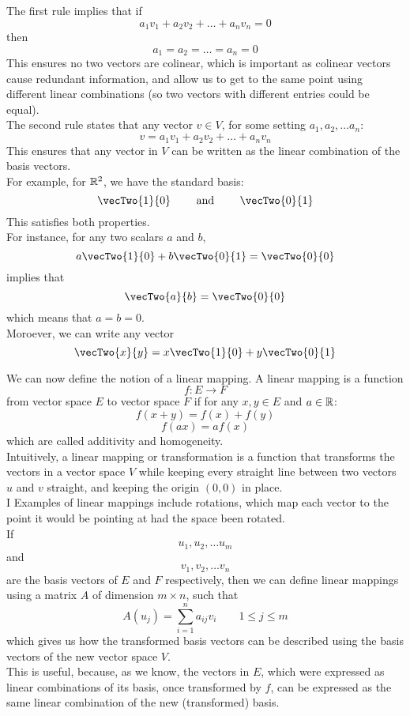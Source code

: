 \documentclass[12pt]{article}
\begin{document}
    The first rule implies that if
    \[ a_1v_1 + a_2v_2 + \dots + a_nv_n = 0 \]
    then 
    \[a_1 = a_2 = \dots = a_n = 0\]
    This ensures no two vectors are colinear,
    which is important as colinear vectors
    cause redundant information,
    and allow us to get to the same point
    using different linear combinations
    (so two vectors with different entries could
    be equal). \\

    The second rule states that any vector $v \in V$,
    for some setting $a_1, a_2, \dots a_n$:
    \[ v = a_1v_1 + a_2v_2 + \dots + a_nv_n \]
    This ensures that any vector in $V$
    can be written as the linear combination
    of the basis vectors. \\

    For example, for $\mathbb{R}^2$,
    we have the standard basis:
    \[ \vecTwo{1}{0} \qquad
    \text{ and } \qquad \vecTwo{0}{1} \]
    This satisfies both properties. \\
    For instance, for any two scalars $a$ and $b$,
    \[ a\vecTwo{1}{0} + b\vecTwo{0}{1} = \vecTwo{0}{0} \]
    implies that 
    \[ \vecTwo{a}{b} = \vecTwo{0}{0}  \]
    which means that $a = b = 0$. \\
    Moroever, we can write any vector
    \[ \vecTwo{x}{y} = x\vecTwo{1}{0} + y\vecTwo{0}{1} \]

    We can now define the notion of a linear
    mapping.
    A linear mapping is a function
    \[ f: E \to F \]
    from vector space $E$ to vector space $F$
    if for any $x, y \in E$ and $a \in \mathbb{R}$:
    \[ f(x+y) = f(x) + f(y) \]
    \[ f(ax) = af(x) \]
    which are called additivity and homogeneity. \\
    Intuitively, a linear mapping or transformation
    is a function that transforms the vectors
    in a vector space $V$ while keeping
    every straight line between two vectors $u$ and $v$
    straight, and keeping the origin $(0, 0)$
    in place. \\
    I
    Examples of linear mappings include rotations,
    which map each vector to the point it would 
    be pointing at had the space been rotated. \\

    If
    \[ u_1, u_2, \dots u_m \]
    and
    \[ v_1, v_2, \dots v_n \]
    are the basis vectors of $E$ and $F$
    respectively,
    then we can define linear mappings using 
    a matrix $A$ of dimension $m \times n$,
    such that 
    \[ A (u_j) = \sum_{i=1}^{n} a_{ij}v_i \qquad
    1 \leq j \leq m \]
    which gives us how the transformed basis
    vectors can be described using
    the basis vectors of the new vector space $V$. \\
    This is useful, because, as we know,
    the vectors in $E$,
    which were expressed as linear combinations
    of its basis,
    once transformed by $f$,
    can be expressed as the same linear combination
    of the new (transformed) basis. \\
\end{document}
